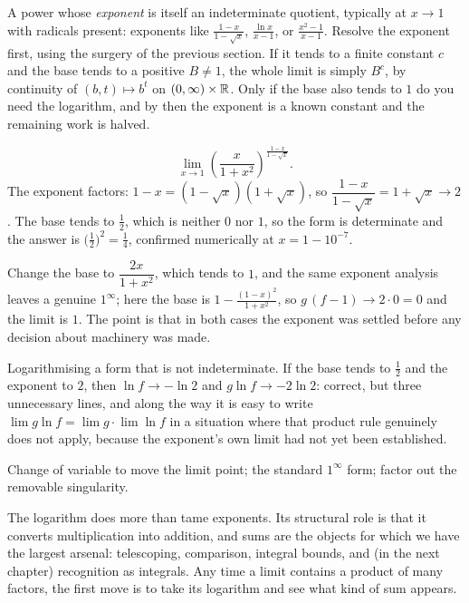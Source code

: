 \cue A power whose \emph{exponent} is itself an indeterminate quotient, typically at $x\to1$ with radicals present: exponents like $\tfrac{1-x}{1-\sqrt x}$, $\tfrac{\ln x}{x-1}$, or $\tfrac{x^{2}-1}{x-1}$.
\method Resolve the exponent first, using the surgery of the previous section. If it tends to a finite constant $c$ and the base tends to a positive $B\neq1$, the whole limit is simply $B^{c}$, by continuity of $(b,t)\mapsto b^{t}$ on $(0,\infty)\times\mathbb{R}$. Only if the base also tends to $1$ do you need the logarithm, and by then the exponent is a known constant and the remaining work is halved.

\begin{worked}
\[\lim_{x\to1}\left(\frac{x}{1+x^{2}}\right)^{\frac{1-x}{1-\sqrt{x}}}.\]
The exponent factors: $1-x=(1-\sqrt x)(1+\sqrt x)$, so $\dfrac{1-x}{1-\sqrt x}=1+\sqrt x\to2$. The base tends to $\tfrac{1}{2}$, which is neither $0$ nor $1$, so the form is determinate and the answer is $\bigl(\tfrac12\bigr)^{2}=\tfrac14$, confirmed numerically at $x=1-10^{-7}$.

Change the base to $\dfrac{2x}{1+x^{2}}$, which tends to $1$, and the same exponent analysis leaves a genuine $1^{\infty}$; here the base is $1-\tfrac{(1-x)^{2}}{1+x^{2}}$, so $g\,(f-1)\to 2\cdot0=0$ and the limit is $1$. The point is that in both cases the exponent was settled before any decision about machinery was made.
\end{worked}

\begin{trap}
Logarithmising a form that is not indeterminate. If the base tends to $\tfrac12$ and the exponent to $2$, then $\ln f\to-\ln 2$ and $g\ln f\to-2\ln2$: correct, but three unnecessary lines, and along the way it is easy to write $\lim g\ln f=\lim g\cdot\lim\ln f$ in a situation where that product rule genuinely does not apply, because the exponent's own limit had not yet been established.
\end{trap}

\begin{seealsob}Change of variable to move the limit point; the standard $1^{\infty}$ form; factor out the removable singularity.\end{seealsob}

The logarithm does more than tame exponents. Its structural role is that it converts multiplication into addition, and sums are the objects for which we have the largest arsenal: telescoping, comparison, integral bounds, and (in the next chapter) recognition as integrals. Any time a limit contains a product of many factors, the first move is to take its logarithm and see what kind of sum appears.

